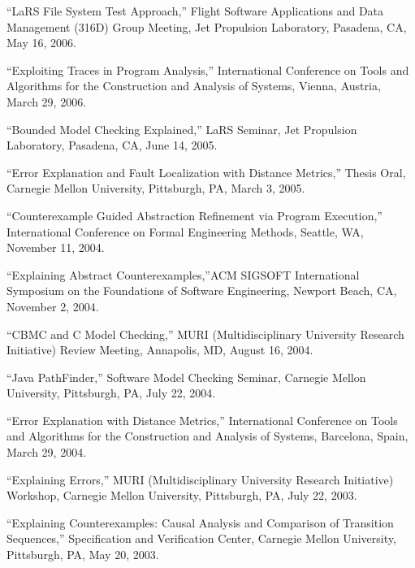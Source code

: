 \documentclass[ComputerScience]{vita}
\begin{document}
\begin{vita}
\begin{Selected Presentations}
\item ``LaRS File System Test Approach,'' Flight Software Applications and Data Management (316D) Group Meeting, Jet Propulsion Laboratory, Pasadena, CA, May 16, 2006.



 \item ``Exploiting Traces in Program Analysis,'' International Conference on Tools and Algorithms for the Construction and Analysis of Systems, Vienna, Austria, March 29, 2006.


 \item ``Bounded Model Checking Explained,'' LaRS Seminar, Jet Propulsion Laboratory, Pasadena, CA, June 14, 2005.

 \item ``Error Explanation and Fault Localization with Distance Metrics,'' Thesis Oral, Carnegie Mellon University, Pittsburgh, PA, March 3, 2005.



  \item ``Counterexample Guided Abstraction Refinement via Program Execution,'' International Conference on Formal Engineering Methods, Seattle, WA, November 11, 2004.



  \item ``Explaining Abstract Counterexamples,''ACM SIGSOFT International Symposium on the Foundations of Software Engineering, Newport Beach, CA, November 2, 2004.



  \item ``CBMC and C Model Checking,'' MURI (Multidisciplinary University Research Initiative) Review Meeting, Annapolis, MD, August 16, 2004.

  \item ``Java PathFinder,'' Software Model Checking Seminar, Carnegie Mellon University, Pittsburgh, PA, July 22, 2004.

  \item ``Error Explanation with Distance Metrics,'' International Conference on Tools and Algorithms for the Construction and Analysis of Systems, Barcelona, Spain, March 29, 2004.  



  \item ``Explaining Errors,'' MURI (Multidisciplinary University Research Initiative) Workshop, Carnegie Mellon University, Pittsburgh, PA, July 22, 2003.

  \item ``Explaining Counterexamples: Causal Analysis and Comparison of Transition Sequences,''  Specification and Verification Center, Carnegie Mellon University, Pittsburgh, PA, May 20, 2003.


\end{Selected Presentations}
\end{vita}
\end{document}
